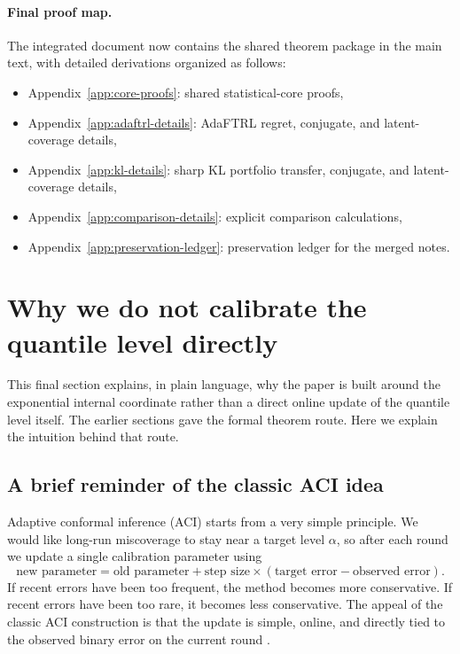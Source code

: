 \documentclass[11pt]{article}
\newcommand{\1}{\mathbf{1}}
\begin{document}
\paragraph{Final proof map.}
The integrated document now contains the shared theorem package in the main text, with detailed derivations organized as follows:
\begin{itemize}[leftmargin=*,itemsep=2pt]
  \item Appendix~\ref{app:core-proofs}: shared statistical-core proofs,
  \item Appendix~\ref{app:adaftrl-details}: AdaFTRL regret, conjugate, and latent-coverage details,
  \item Appendix~\ref{app:kl-details}: sharp KL portfolio transfer, conjugate, and latent-coverage details,
  \item Appendix~\ref{app:comparison-details}: explicit comparison calculations,
  \item Appendix~\ref{app:preservation-ledger}: preservation ledger for the merged notes.
\end{itemize}



\appendix

\section{Why we do not calibrate the quantile level directly}

This final section explains, in plain language, why the paper is built around the exponential internal coordinate rather than a direct online update of the quantile level itself. The earlier sections gave the formal theorem route. Here we explain the intuition behind that route.

\subsection{A brief reminder of the classic ACI idea}

Adaptive conformal inference (ACI) starts from a very simple principle. We would like long-run miscoverage to stay near a target level $\alpha$, so after each round we update a single calibration parameter using
\[
\text{new parameter}
=
\text{old parameter}
+
\text{step size}\times(\text{target error}-\text{observed error}).
\]
If recent errors have been too frequent, the method becomes more conservative. If recent errors have been too rare, it becomes less conservative. The appeal of the classic ACI construction is that the update is simple, online, and directly tied to the observed binary error on the current round \citep{GibbsCandes2021,GibbsCandes2024}.
\end{document}
